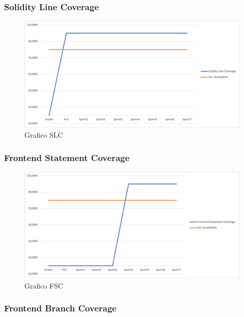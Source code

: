 \subsubsection{Solidity Line Coverage}

\begin{figure}[H]
\centering
\includegraphics[width=1\textwidth]{src/img/Solidity Line Coverage.png}
\caption{Grafico SLC}
\end{figure}

\subsubsection{Frontend Statement Coverage}

\begin{figure}[H]
\centering
\includegraphics[width=1\textwidth]{src/img/Frontend Statement Coverage.png}
\caption{Grafico FSC}
\end{figure}

\subsubsection{Frontend Branch Coverage}

